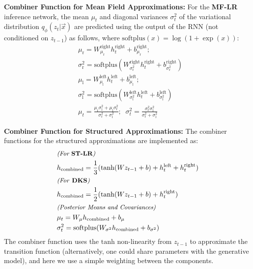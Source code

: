 \documentclass[letterpaper]{article}
\newcommand{\mathtext}[1]{\small{\textit{(#1)}}}
\newcommand{\vecx}{\vec{x}}
\theoremstyle{plain}
\newcommand{\Tanh}{\text{tanh}}
\newcommand{\Softplus}{\text{softplus}}
\newcommand{\DKS}{\textbf{DKS}\xspace}
\begin{document}
{\bf Combiner Function for Mean Field Approximations:}
For the \textbf{MF-LR} inference network, the mean $\mu_t$ and
diagonal variances $\sigma^2_t$ of the variational distribution
$q_\phi(z_t|\vecx)$ are predicted using the output of the RNN (not
conditioned on $z_{t-1}$) as follows, where $\Softplus(x) = \log(1+\exp(x))$:
\begin{align}
	&\mu_{\text{r}}     = W^{\text{right}}_{\mu_{\text{r}}} h_t^{\text{right}} + b^{\text{right}}_{\mu_{\text{r}}}; \nonumber\\ 
	&\sigma^2_{\text{r}}= \Softplus(W^{\text{right}}_{\sigma^2_{\text{r}}} h_t^{\text{right}} + b^{\text{right}}_{\sigma^2_{\text{r}}})  \nonumber\\
	&\mu_{\text{l}}     = W^{\text{left}}_{\mu_{\text{l}}} h_t^{\text{left}} + b^{\text{left}}_{\mu_{\text{l}}};\nonumber\\
	&\sigma^2_{\text{l}}= \Softplus(W^{\text{left}}_{\sigma^2_{\text{l}}}h_t^{\text{left}} + b^{\text{left}}_{\sigma^2_{\text{l}}})  \nonumber\\
	&\mu_{t}           = \frac{\mu_{\text{r}}\sigma^2_{\text{l}}+\mu_{\text{l}}\sigma^2_{\text{r}}}{\sigma^2_{\text{r}}+\sigma^2_{\text{l}} }; \;\;
	\sigma^2_{t}       = \frac{\sigma^2_{\text{r}}\sigma^2_{\text{l}}}{\sigma^2_{\text{r}}+\sigma^2_{\text{l}}} \qquad\nonumber 
\end{align}


{\bf Combiner Function for Structured Approximations:} 
The combiner functions for the structured approximations are
implemented as:
\begin{align*}
&\mathtext{For {\bf ST-LR}} \nonumber\\
&h_{\text{combined}}= \frac{1}{3}(\Tanh(W z_{t-1}+b) + h_t^{\text{left}} + h_t^{\text{right}})\\ 
&\mathtext{For  {\bf \DKS}}\nonumber\\ 
&h_{\text{combined}}= \frac{1}{2}(\Tanh(W z_{t-1}+b) + h_t^{\text{right}})\\
&\mathtext{Posterior Means and Covariances} \;\;\\
&\mu_{t} = W_{\mu}h_{\text{combined}}+b_{\mu} \nonumber\\
&\sigma^2_{t} = \Softplus(W_{\sigma^2}h_{\text{combined}}+b_{\sigma^2}) 
\end{align*}
The combiner function uses the $\Tanh$ non-linearity from $z_{t-1}$ to
approximate the transition function (alternatively, one could share
parameters with the generative model), and here we use a
simple weighting between the components.
\end{document}
